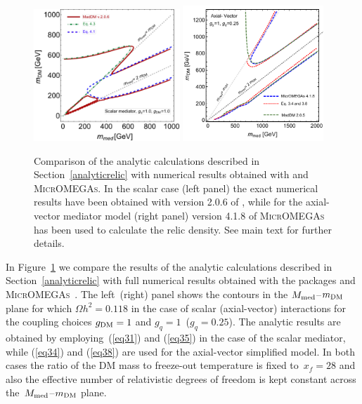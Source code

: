 \begin{center}
\begin{figure}[t!]
\includegraphics[width=0.49\textwidth]{figures/scalar_mediator_omegah2.pdf}
\includegraphics[width=0.47\textwidth]{figures/AV_comparison2.pdf} 
\caption{Comparison of the analytic calculations described in Section~\ref{analyticrelic}  with numerical results obtained with \maddm and \textsc{MicrOMEGAs}. In the scalar case (left panel) the exact numerical results have been obtained with version 2.0.6 of \maddm, while for the axial-vector mediator model (right panel)
version 4.1.8 of \textsc{MicrOMEGAs} has been used to calculate the relic density. See main text for further details.}
\label{fig:analcalc}
\end{figure}
\end{center}

In Figure~\ref{fig:analcalc} we compare the results of the analytic calculations described in Section~\ref{analyticrelic}  with full numerical results obtained with the packages \maddm and \textsc{MicrOMEGAs}~\cite{Belanger:2014vza}. The left~(right) panel shows the contours in the $M_{\rm med}$--$m_{\rm DM}$ plane for which $\Omega h^2 = 0.118$ in the case of scalar (axial-vector) interactions for the coupling choices $g_{\rm DM} = 1$ and $g_q = 1$~($g_q = 0.25$). The analytic results are obtained by employing~(\ref{eq31}) and (\ref{eq35}) in the case of the scalar mediator, while (\ref{eq34}) and (\ref{eq38}) are used for the axial-vector simplified model. In both cases the ratio of the DM mass to freeze-out temperature is fixed to~$x_f = 28$ and also the effective number of relativistic degrees of freedom is kept constant across the~$M_{\rm med}$--$m_{\rm DM}$ plane.

